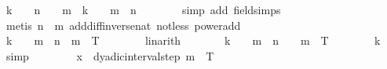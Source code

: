 \begin{isabellebody}
\ {\isachardoublequoteopen}k\ {\isacharslash}{\kern0pt}\ {}\ {\isacharcircum}{\kern0pt}\ n\ {\isacharasterisk}{\kern0pt}\ {}\ {\isacharcircum}{\kern0pt}\ m\ {\isacharequal}{\kern0pt}\ k\ {\isacharasterisk}{\kern0pt}\ {}\ {\isacharcircum}{\kern0pt}\ {\isacharparenleft}{\kern0pt}m\ {\isacharminus}{\kern0pt}\ n{\isacharparenright}{\kern0pt}{\isachardoublequoteclose}\isanewline
\ \ \ \ \ \ \isamarkupfalse%
\ {\isacharparenleft}{\kern0pt}simp\ add{\isacharcolon}{\kern0pt}\ field{\isacharunderscore}{\kern0pt}simps{\isacharparenright}{\kern0pt}\isanewline
\ \ \ \ \ \ \isamarkupfalse%
\ {\isacharparenleft}{\kern0pt}metis\ {\isacartoucheopen}n\ {\isasymle}\ m{\isacartoucheclose}\ add{\isacharunderscore}{\kern0pt}diff{\isacharunderscore}{\kern0pt}inverse{\isacharunderscore}{\kern0pt}nat\ not{\isacharunderscore}{\kern0pt}less\ power{\isacharunderscore}{\kern0pt}add{\isacharparenright}{\kern0pt}\isanewline
\ \ \ \ \ \ \isamarkupfalse%
\isanewline
\ \ \ \ \isamarkupfalse%
\ \isamarkupfalse%
\ {\isachardoublequoteopen}k\ {\isacharasterisk}{\kern0pt}\ {}\ {\isacharcircum}{\kern0pt}\ {\isacharparenleft}{\kern0pt}m\ {\isacharminus}{\kern0pt}\ n{\isacharparenright}{\kern0pt}\ {\isasymle}\ {\isasymlfloor}{}{\isacharcircum}{\kern0pt}m\ {\isacharasterisk}{\kern0pt}\ T{\isasymrfloor}{\isachardoublequoteclose}\isanewline
\ \ \ \ \ \ \isamarkupfalse%
\ linarith\isanewline
\ \ \ \ \isamarkupfalse%
\ \isamarkupfalse%
\ {\isachardoublequoteopen}k\ {\isacharasterisk}{\kern0pt}\ {}\ {\isacharcircum}{\kern0pt}\ {\isacharparenleft}{\kern0pt}m\ {\isacharminus}{\kern0pt}\ n{\isacharparenright}{\kern0pt}\ {\isasymin}\ {\isacharbraceleft}{\kern0pt}{}\ {\isachardot}{\kern0pt}{\isachardot}{\kern0pt}\ {\isasymlfloor}{}{\isacharcircum}{\kern0pt}m\ {\isacharasterisk}{\kern0pt}\ T{\isasymrfloor}{\isacharbraceright}{\kern0pt}{\isachardoublequoteclose}\isanewline
\ \ \ \ \ \ \isamarkupfalse%
\ k{\isacharparenleft}{\kern0pt}{}{\isacharparenright}{\kern0pt}\ \isamarkupfalse%
\ simp\isanewline
\ \ \isamarkupfalse%
\isanewline
\ \ \isamarkupfalse%
\ \isamarkupfalse%
\ {\isachardoublequoteopen}x\ {\isasymin}\ dyadic{\isacharunderscore}{\kern0pt}interval{\isacharunderscore}{\kern0pt}step\ m\ {}\ T{\isachardoublequoteclose}\isanewline
\ \ \ \ \isamarkupfalse%

\end{isabellebody}
